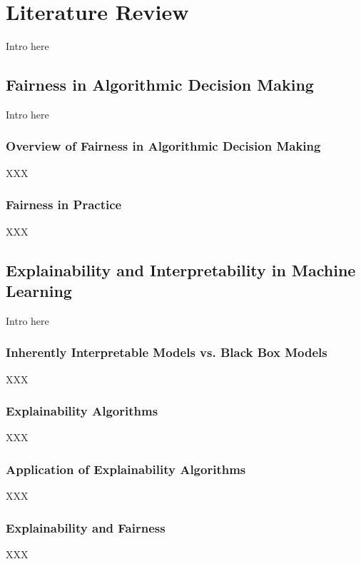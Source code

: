 \chapter{Literature Review}\label{chap:lit}

Intro here

\section{Fairness in Algorithmic Decision Making}\label{sec:fairness}

Intro here

\subsection{Overview of Fairness in Algorithmic Decision Making}\label{subsec:overview}

XXX

\subsection{Fairness in Practice}\label{subsec:practice}

XXX

\section{Explainability and Interpretability in Machine Learning}\label{sec:explainability}

Intro here

\subsection{Inherently Interpretable Models vs. Black Box Models}\label{subsec:inherently}

XXX

\subsection{Explainability Algorithms}\label{subsec:algorithms}

XXX

\subsection{Application of Explainability Algorithms}\label{subsec:application}

XXX

\subsection{Explainability and Fairness}\label{subsec:explainability_fairness}

XXX